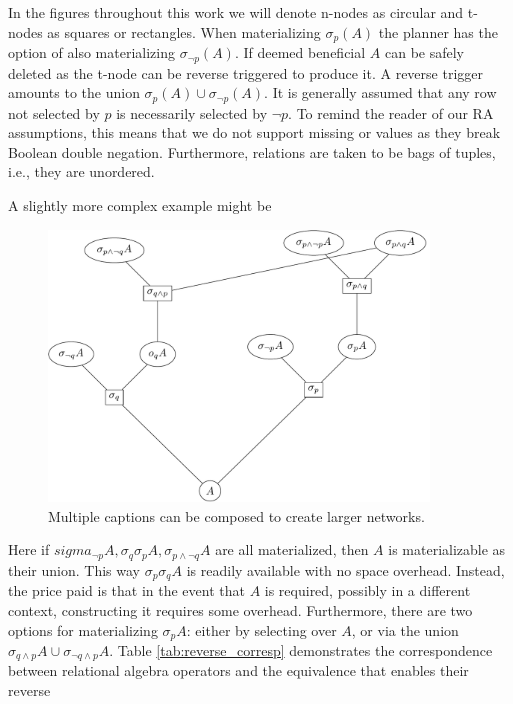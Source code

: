 In the figures throughout this work we will denote n-nodes as
circular and t-nodes as squares or rectangles. When materializing
\(\sigma_p(A)\) the planner has the option of also materializing
\(\sigma_{\neg p}(A)\). If deemed beneficial \(A\) can be safely
deleted as the t-node can be reverse triggered to produce it. A
reverse trigger amounts to the union \(\sigma_{p}(A) \cup
\sigma_{\neg p}(A)\). It is generally assumed
that any row not selected by \(p\) is necessarily selected by \(\neg
p\). To remind the reader of our RA assumptions,
this means that we do not support missing or  values as
they break Boolean double negation. Furthermore, relations are taken
to be bags of tuples, i.e., they are unordered.

A slightly more complex example might be

\begin{figure}[H]
  \centering
  \includegraphics[width=0.9\textwidth]{./imgs/selsub.pdf}
  \caption{Multiple captions can be composed to create larger
    networks.}
\end{figure}

Here if
\(sigma_{\neg p}A,\sigma_q \sigma_{p} A,\sigma_{p \land \neg q}A\) are
all materialized, then \(A\) is materializable as their union. This
way \(\sigma_p \sigma_q A\) is readily available with no space
overhead. Instead, the price paid is that in the event that \(A\) is
required, possibly in a different context, constructing it requires some
overhead. Furthermore, there are two options for materializing
\(\sigma_p A\): either by selecting over \(A\), or via the union
\(\sigma_{q \land p}A \cup \sigma_{\neg q \land p}A\). Table \ref{tab:reverse_corresp}
demonstrates the correspondence between relational algebra operators
and the equivalence that enables their reverse

